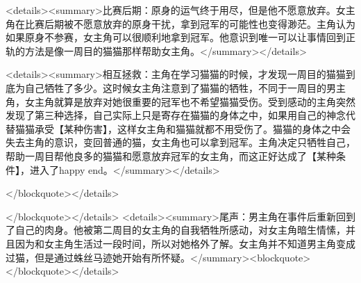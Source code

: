 <details><summary>比赛后期：原身的运气终于用尽，但是他不愿意放弃。女主角在比赛后期被不愿意放弃的原身干扰，拿到冠军的可能性也变得渺茫。主角认为如果原身不参赛，女主角可以很顺利地拿到冠军。他意识到唯一可以让事情回到正轨的方法是像一周目的猫猫那样帮助女主角。</summary></details>

<details><summary>相互拯救：主角在学习猫猫的时候，才发现一周目的猫猫到底为自己牺牲了多少。这时候女主角注意到了猫猫的牺牲，不同于一周目的男主角，女主角就算是放弃对她很重要的冠军也不希望猫猫受伤。受到感动的主角突然发现了第三种选择，自己实际上只是寄存在猫猫的身体之中，如果用自己的神念代替猫猫承受【某种伤害】，这样女主角和猫猫就都不用受伤了。猫猫的身体之中会失去主角的意识，变回普通的猫，女主角也可以拿到冠军。主角决定只牺牲自己，帮助一周目帮他良多的猫猫和愿意放弃冠军的女主角，而这正好达成了【某种条件】，进入了happy end。</summary></details>

</blockquote></details>

</blockquote></details>
<details><summary>尾声：男主角在事件后重新回到了自己的肉身。他被第二周目的女主角的自我牺牲所感动，对女主角暗生情愫，并且因为和女主角生活过一段时间，所以对她格外了解。女主角并不知道男主角变成过猫，但是通过蛛丝马迹她开始有所怀疑。</summary><blockquote>
</blockquote></details>
